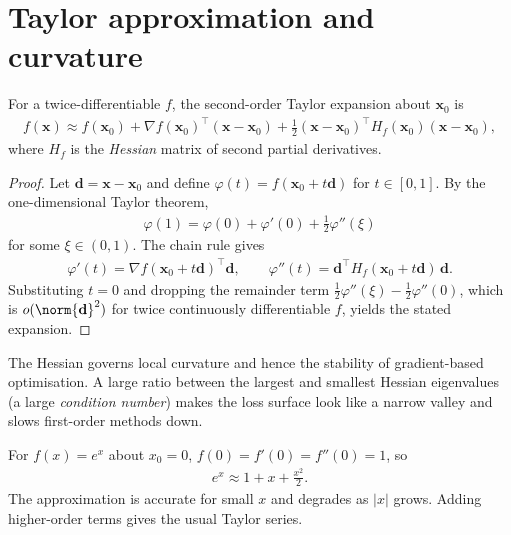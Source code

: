 \documentclass[a4paper, 12pt]{book}
\begin{document}
\section{Taylor approximation and curvature}


\begin{proposition}
    For a twice-differentiable $f$, the second-order Taylor expansion about
$\mathbf{x}_0$ is
\begin{align}
    f(\mathbf{x}) \approx f(\mathbf{x}_0)
    + \nabla f(\mathbf{x}_0)^\top (\mathbf{x} - \mathbf{x}_0)
    + \frac{1}{2} (\mathbf{x} - \mathbf{x}_0)^\top H_f(\mathbf{x}_0) (\mathbf{x} - \mathbf{x}_0),
\end{align}
where $H_f$ is the \emph{Hessian} matrix of second partial derivatives.
\end{proposition}
\begin{proof}
    Let $\mathbf{d}=\mathbf{x}-\mathbf{x}_0$ and define
    $\varphi(t)=f(\mathbf{x}_0+t\mathbf{d})$ for $t\in[0,1]$. By the
    one-dimensional Taylor theorem,
    \begin{align}
        \varphi(1) = \varphi(0) + \varphi'(0) + \frac12\varphi''(\xi)
    \end{align}
    for some $\xi\in(0,1)$. The chain rule gives
    \begin{align}
        \varphi'(t) = \nabla f(\mathbf{x}_0+t\mathbf{d})^\top\mathbf{d},
        \qquad
        \varphi''(t) = \mathbf{d}^\top H_f(\mathbf{x}_0+t\mathbf{d})\,\mathbf{d}.
    \end{align}
    Substituting $t=0$ and dropping the remainder term
    $\frac12\varphi''(\xi)-\frac12\varphi''(0)$, which is $o(\norm{\mathbf{d}}^2)$
    for twice continuously differentiable $f$, yields the stated expansion.
\end{proof}
The Hessian governs local curvature and hence the stability of gradient-based optimisation. A large ratio between the largest and smallest Hessian eigenvalues (a large \emph{condition number}) makes the loss surface look like a narrow valley and slows first-order methods down.

\begin{example}
    For $f(x)=e^x$ about $x_0=0$, $f(0)=f'(0)=f''(0)=1$, so
    \begin{align}
        e^x \approx 1+x+\frac{x^2}{2}.
    \end{align}
    The approximation is accurate for small $x$ and degrades as $|x|$ grows. Adding
    higher-order terms gives the usual Taylor series.
\end{example}
\end{document}
